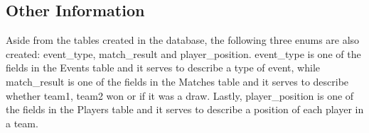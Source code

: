 \subsection{Other Information}


Aside from the tables created in the database, the following three enums are also created:
event\_type, match\_result and player\_position. event\_type is one of the fields in the Events table and it serves to describe a type of event, while match\_result is one of the fields in the Matches table and it serves to describe whether team1, team2 won or if it was a draw. Lastly, player\_position is one of the fields in the Players table and it serves to describe a position of each player in a team.